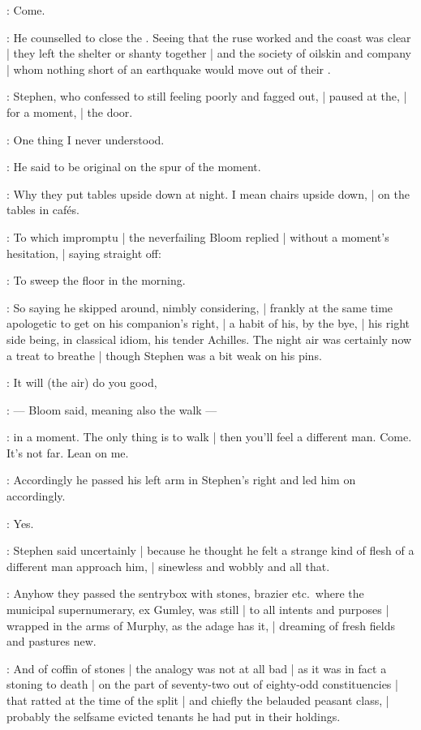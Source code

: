 \Bloom:
Come.

:
He counselled to close the .
Seeing that the ruse worked and the coast was clear |
they left the shelter or shanty together |
and the  society of oilskin and company |
whom nothing short of an earthquake would move out of their .

:
Stephen, who confessed to still feeling poorly and fagged out, |
paused at the, |
for a moment, |
the door.

\Stephen:
One thing I never understood.

:
He said to be original on the spur of the moment.

\Stephen:
Why they put tables upside down at night.
I mean chairs upside down, |
on the tables in cafés.

:
To which impromptu |
the neverfailing Bloom replied |
without a moment's hesitation, |
saying straight off:

\Bloom:
To sweep the floor in the morning.

:
So saying he skipped around, nimbly considering, |
frankly at the same time apologetic to get on his companion's right, |
a habit of his, by the bye, |
his right side being, in classical idiom, his tender Achilles.
The night air was certainly now a treat to breathe |
though Stephen was a bit weak on his pins.

\Bloom:
It will (the air) do you good,

:
    --- Bloom said, meaning also the walk ---

\Bloom:
in a moment.
The only thing is to walk |
then you'll feel a different man.
Come.
It's not far.
Lean on me.

:
Accordingly he passed his left arm in Stephen's right and led him on accordingly.

\Stephen:
Yes.

:
Stephen said uncertainly |
because he thought he felt a strange kind of flesh of a different man approach him, |
sinewless and wobbly and all that.

:
Anyhow they passed the sentrybox with stones, brazier etc.\
where the municipal supernumerary, ex Gumley, was still |
to all intents and purposes |
wrapped in the arms of Murphy, as the adage has it, |
dreaming of fresh fields and pastures new.

:
And  of coffin of stones |
the analogy was not at all bad |
as it was in fact a stoning to death |
on the part of seventy-two out of eighty-odd constituencies |
that ratted at the time of the split |
and chiefly the belauded peasant class, |
probably the selfsame evicted tenants he had put in their holdings.

